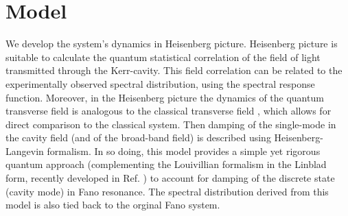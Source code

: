 \documentclass[12pt]{article}
\begin{document}
\section{Model}
We develop the system's dynamics in Heisenberg picture. Heisenberg picture is 
suitable to calculate the quantum statistical correlation of the field of light 
transmitted through the Kerr-cavity. This field correlation can be related to 
the experimentally observed spectral distribution, using the spectral response 
function. \cite{scully1999quantum} Moreover, in the Heisenberg picture the 
dynamics of the quantum transverse field is analogous to the classical 
transverse field \cite{tannoudji1992atom}, which allows for direct comparison 
to the classical system. \cite{pan2019elucidating} Then damping of the 
single-mode in the cavity field (and of the broad-band field) is described 
using Heisenberg-Langevin formalism. In so doing, this model provides a simple 
yet rigorous quantum approach (complementing the Louivillian formalism in the
Linblad form, recently developed in Ref. \cite{finkelstein2015fano, 
finkelstein2016nonlinear}) to account for damping of the discrete state 
(cavity mode) in Fano resonance. The spectral distribution derived from 
this model is also tied back to the orginal Fano system. \cite{fano1961effects}
\end{document}
